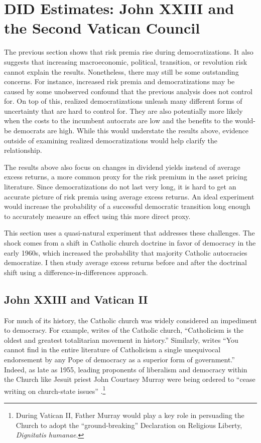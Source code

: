 
\section{DID Estimates: John XXIII and the Second Vatican Council}\label{section:svc}

The previous section shows that risk premia rise during democratizations. It also suggests that increasing macroeconomic, political, transition, or revolution risk cannot explain the results. Nonetheless, there may still be some outstanding concerns. For instance, increased risk premia and democratizations may be caused by some unobserved confound that the previous analysis does not control for. On top of this, realized democratizations unleash many different forms of uncertainty that are hard to control for.  They are also potentially more likely when the costs to the incumbent autocrats are low and the benefits to the would-be democrats are high. While this would understate the results above, evidence outside of examining realized democratizations would help clarify the relationship.

The results above also focus on changes in dividend yields instead of average excess returns, a more common proxy for the risk premium in the asset pricing literature.  Since democratizations do not last very long, it is hard to get an accurate picture of risk premia using average excess returns. An ideal experiment would increase the probability of a successful democratic transition long enough to accurately measure an effect using this more direct proxy.

This section uses a quasi-natural experiment that addresses these challenges. The shock comes from a shift in Catholic church doctrine in favor of democracy in the early 1960s, which increased the probability that majority Catholic autocracies democratize. I then study average excess returns before and after the doctrinal shift using a difference-in-differences approach.

\subsection{John XXIII and Vatican II}
\label{par:historical_context_beg}
For much of its history, the Catholic church was widely considered an impediment to democracy. For example, \cite{Hook1940} writes of the Catholic church, ``Catholicism is the oldest and greatest totalitarian movement in history.'' Similarly, \cite{Blanshard1949} writes ``You cannot find in the entire literature of Catholicism a single unequivocal endorsement by any Pope of democracy as a superior form of government.'' Indeed, as late as 1955, leading proponents of liberalism and democracy within the Church like Jesuit priest John Courtney Murray were being ordered to ``cease writing on church-state issues'' \citep{Philpott2004}.\footnote{During Vatican II, Father Murray would play a key role in persuading the Church to adopt the ``ground-breaking'' Declaration on Religious Liberty, \textit{Dignitatis humanae}.}

